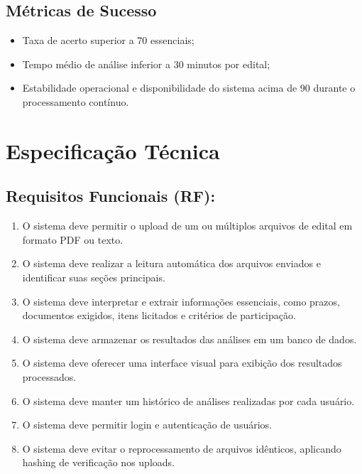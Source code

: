 \documentclass[a4paper,12pt]{article}
\begin{document}
\subsection{Métricas de Sucesso}
\begin{itemize}
    \item Taxa de acerto superior a 70%
essenciais;
    \item Tempo médio de análise inferior a 30 minutos por edital;
    \item Estabilidade operacional e disponibilidade do sistema acima de 90%
durante o processamento contínuo.
\end{itemize}

\section{Especificação Técnica}

\subsection{Requisitos Funcionais (RF):}
\begin{enumerate}[label=RF\arabic*:]
    \item O sistema deve permitir o upload de um ou múltiplos arquivos de
edital em formato PDF ou texto.
    \item O sistema deve realizar a leitura automática dos arquivos enviados e
identificar suas seções principais.
    \item O sistema deve interpretar e extrair informações essenciais, como
prazos, documentos exigidos, itens licitados e critérios de
participação.
    \item O sistema deve armazenar os resultados das análises em um banco
de dados.
    \item O sistema deve oferecer uma interface visual para exibição dos
resultados processados.
    \item O sistema deve manter um histórico de análises realizadas por cada
usuário.
    \item O sistema deve permitir login e autenticação de usuários.
    \item O sistema deve evitar o reprocessamento de arquivos idênticos,
aplicando hashing de verificação nos uploads.
\end{enumerate}
\end{document}
